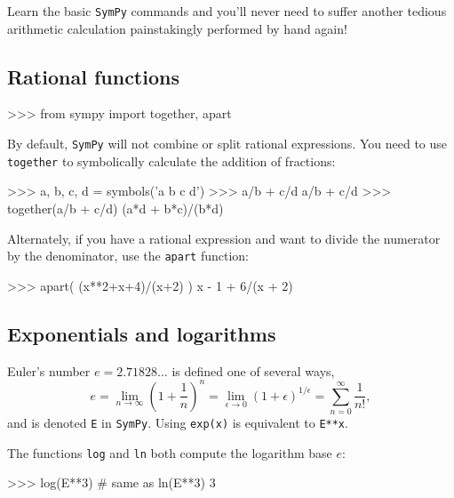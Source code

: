 \noindent
Learn the basic \texttt{SymPy} commands 
and you'll never need to suffer another tedious arithmetic calculation painstakingly performed by hand again!



\subsection{Rational functions}
\label{basics:rational_functions}

\small
\begin{verbatimtab}
>>> from sympy import together, apart
\end{verbatimtab}
\normalsize

\noindent
By default, \texttt{SymPy} will not combine or split rational expressions.
You need to use \texttt{together} to symbolically calculate the addition of fractions:

\small
\begin{verbatimtab}
>>> a, b, c, d = symbols('a b c d')
>>> a/b + c/d
a/b + c/d
>>> together(a/b + c/d)
(a*d + b*c)/(b*d)
\end{verbatimtab}
\normalsize

\noindent
Alternately, if you have a rational expression and want to divide the numerator by the denominator,
use the \texttt{apart} function:

\small
\begin{verbatimtab}
>>> apart( (x**2+x+4)/(x+2)  )
x - 1  +  6/(x + 2)
\end{verbatimtab}
\normalsize


\subsection{Exponentials and logarithms}
\label{basics:exponentials_and_logarithms}

Euler's number $e=2.71828\ldots$ is defined one of several ways,												
\[
  e = \lim_{n\to \infty} \left( 1 + \frac{1}{n}\right)^{n}
    = \lim_{\epsilon \to 0} \left( 1 + \epsilon\right)^{1/\epsilon}
    = \sum_{n=0}^\infty \frac{1}{n!},
\]
and is denoted \texttt{E} in \texttt{SymPy}.
Using \texttt{exp(x)} is equivalent to \texttt{E**x}.

The functions \texttt{log} and \texttt{ln} both compute the logarithm base $e$:

\small
\begin{verbatimtab}
>>> log(E**3)    # same as ln(E**3)
3
\end{verbatimtab}
\normalsize

